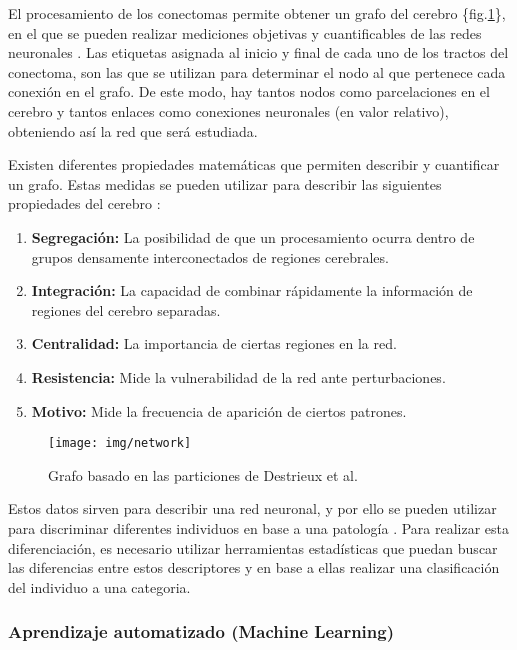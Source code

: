 \documentclass[fleqn,12pt]{UICArticle} %
\begin{document}
El procesamiento de los conectomas permite obtener un grafo del cerebro \{fig.\ref{fig:network}\}, en el que se pueden realizar mediciones objetivas y cuantificables de las redes neuronales \cite{Mori2002}. Las etiquetas asignada al inicio y final de cada uno de los tractos del conectoma, son las que se utilizan para determinar el nodo al que pertenece cada conexión en el grafo. De este modo, hay tantos nodos como parcelaciones en el cerebro y tantos enlaces como conexiones neuronales (en valor relativo), obteniendo así la red que será estudiada.

Existen diferentes propiedades matemáticas que permiten describir y cuantificar un grafo. Estas medidas se pueden utilizar para describir las siguientes propiedades del cerebro \cite{Rubinov2010}:
\begin{enumerate}[noitemsep]
\item \textbf{Segregación:} La posibilidad de que  un procesamiento ocurra dentro de grupos densamente interconectados de regiones cerebrales.
\item \textbf{Integración:} La capacidad de combinar rápidamente la información de regiones del cerebro separadas.
\item \textbf{Centralidad:} La importancia de ciertas regiones en la red.
\item \textbf{Resistencia:} Mide la vulnerabilidad de la red ante perturbaciones.
\item \textbf{Motivo:} Mide la frecuencia de aparición de ciertos patrones.
\end{enumerate}

\begin{figure}[p]
	\centering
	\texttt{[image: img/network]}
	\vspace{5mm} 
	\caption{Grafo basado en las particiones de Destrieux et al.\cite{Destrieux2010}}
	\label{fig:network}
\end{figure}

Estos datos sirven para describir una red neuronal, y por ello se pueden utilizar para discriminar diferentes individuos en base a una patología \cite{Muthuraman2016}. Para realizar esta diferenciación, es necesario utilizar herramientas estadísticas que puedan buscar las diferencias entre estos descriptores y en base a ellas realizar una clasificación del individuo a una categoria.


\subsubsection{Aprendizaje automatizado (Machine Learning)}
\end{document}
